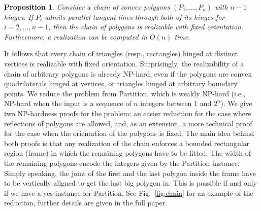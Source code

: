 \documentclass{article}
\theoremstyle{plain}%
\newtheorem{proposition}{Proposition}
\begin{document}
\begin{proposition}\label{pp:chain}
Consider a chain of convex polygons $(P_1,\ldots , P_n)$ with $n-1$ hinges.
If $P_i$ admits parallel tangent lines through both of its hinges for $i=2,\ldots ,n-1$,
then the chain of polygons is realizable with fixed orientation. Furthermore, a
realization can be computed in $O(n)$ time.
\end{proposition}
It follows that every chain of triangles (resp., rectangles) hinged at distinct vertices is realizable with fixed orientation.
Surprisingly, the realizability of a chain of arbitrary polygons is already NP-hard, even if the polygons are convex quadrilaterals hinged at vertices, or triangles hinged at arbitrary boundary points. We reduce the problem from {\sc Partition}, which is weakly NP-hard (i.e., NP-hard when the input is a sequence of $n$ integers between 1 and $2^n$). We give two NP-hardness proofs for the problem: an easier reduction for the case where reflections of polygons are allowed, and, as an extension,  a more technical proof for the case when the orientation of the polygons is fixed. The main idea behind both proofs is that any realization of the chain enforces a bounded rectangular region (frame) in which the remaining polygons have to be fitted. The width of the remaining polygons encode the integers given by the {\sc Partition} instance. Simply speaking, the joint of the first and the last polygon inside the frame have to be vertically aligned to get the last big polygon in. This is possible if and only if we have a yes-instance for {\sc Partition}. See Fig.~\ref{fig:chain} for an example of the reduction, further details are given in the full paper.
\end{document}
